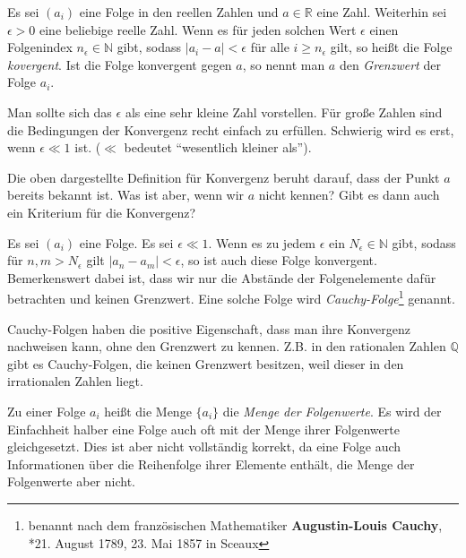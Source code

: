 \begin{definition}\label{def:lim}
Es sei $(a_i)$ eine Folge in den reellen Zahlen und $a\in \mathbb{R}$ eine Zahl. Weiterhin sei $\epsilon>0$ eine beliebige reelle Zahl. Wenn es für jeden solchen Wert $\epsilon$ einen Folgenindex $n_\epsilon \in \mathbb{N}$ gibt, sodass $\vert a_i -a\vert <\epsilon$ für alle $i\ge n_\epsilon$ gilt, so heißt die Folge \emph{kovergent}. Ist die Folge konvergent gegen $a$, so nennt man $a$ den \emph{Grenzwert} der Folge $a_i$.
\end{definition}

Man sollte sich das $\epsilon$ als eine sehr kleine Zahl vorstellen. Für große Zahlen sind die Bedingungen der Konvergenz recht einfach zu erfüllen. Schwierig wird es erst, wenn $\epsilon\ll 1$ ist. ($\ll$ bedeutet "`wesentlich kleiner als"').

Die oben dargestellte Definition für Konvergenz beruht darauf, dass der Punkt $a$ bereits bekannt ist. Was ist aber, wenn wir $a$ nicht kennen? Gibt es dann auch ein Kriterium für die Konvergenz?

\begin{definition}
Es sei $(a_i)$ eine Folge. Es sei $\epsilon \ll 1$. Wenn es zu jedem $\epsilon$ ein $N_\epsilon \in \mathbb{N}$ gibt, sodass für $n,m > N_\epsilon $ gilt $\vert a_n -a_m \vert <\epsilon$, so ist auch diese Folge konvergent. Bemerkenswert dabei ist, dass wir nur die Abstände der Folgenelemente dafür betrachten und keinen Grenzwert. Eine solche Folge wird \emph{Cauchy-Folge}\footnote{benannt nach dem französischen Mathematiker \textbf{Augustin-Louis Cauchy}, *21. August 1789, 23. Mai 1857 in Sceaux} genannt.
\end{definition}

Cauchy-Folgen haben die positive Eigenschaft, dass man ihre Konvergenz nachweisen kann, ohne den Grenzwert zu kennen. Z.B. in den rationalen Zahlen $\mathbb{Q}$ gibt es Cauchy-Folgen, die keinen Grenzwert besitzen, weil dieser in den irrationalen Zahlen liegt.


\begin{definition}
Zu einer Folge $a_i$ heißt die Menge $\lbrace a_i \rbrace$ die \emph{Menge der Folgenwerte}. Es wird der Einfachheit halber eine Folge auch oft mit der Menge ihrer Folgenwerte gleichgesetzt. Dies ist aber nicht vollständig korrekt, da eine Folge auch Informationen über die Reihenfolge ihrer Elemente enthält, die Menge der Folgenwerte aber nicht. 
\end{definition}

